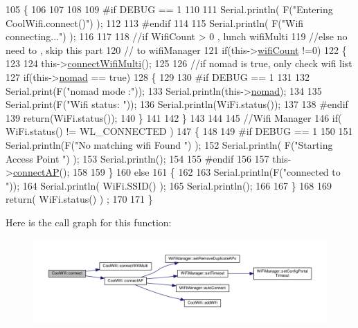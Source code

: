 \begin{DoxyCode}
105 \{       
106 
107 
108 
109 \textcolor{preprocessor}{#if DEBUG == 1 }
110 
111     Serial.println( F(\textcolor{stringliteral}{"Entering CoolWifi.connect()"}) );
112 
113 \textcolor{preprocessor}{#endif}
114 
115     Serial.println( F(\textcolor{stringliteral}{"Wifi connecting..."}) );
116 
117 
118     \textcolor{comment}{//if WifiCount > 0 , lunch wifiMulti}
119     \textcolor{comment}{//else no need to , skip this part}
120     \textcolor{comment}{// to wifiManager  }
121     \textcolor{keywordflow}{if}(this->\hyperlink{class_cool_wifi_ab133bd92fcb895b884deecd6678592e4}{wifiCount} !=0)
122     \{
123     
124         this->\hyperlink{class_cool_wifi_a419de92d738f14b7444cf822b3ab0070}{connectWifiMulti}();
125         
126         \textcolor{comment}{//if nomad is true, only check wifi list}
127         \textcolor{keywordflow}{if}(this->\hyperlink{class_cool_wifi_ab7d9643c4af7bac3be331ef008b2ea27}{nomad} == \textcolor{keyword}{true})
128         \{
129     
130 \textcolor{preprocessor}{        #if DEBUG == 1}
131     
132             Serial.print(F(\textcolor{stringliteral}{"nomad mode :"}));
133             Serial.println(this->\hyperlink{class_cool_wifi_ab7d9643c4af7bac3be331ef008b2ea27}{nomad});
134         
135             Serial.print(F(\textcolor{stringliteral}{"Wifi status: "}));
136             Serial.println(WiFi.status());
137         
138 \textcolor{preprocessor}{        #endif  }
139             \textcolor{keywordflow}{return}(WiFi.status());  
140         \}
141 
142     \}
143 
144 
145     \textcolor{comment}{//Wifi Manager}
146     \textcolor{keywordflow}{if}( WiFi.status() != WL\_CONNECTED ) 
147     \{
148 
149 \textcolor{preprocessor}{    #if DEBUG == 1 }
150     
151         Serial.println(F(\textcolor{stringliteral}{"No matching wifi Found "}) );
152         Serial.println( F(\textcolor{stringliteral}{"Starting Access Point "}) );  
153         Serial.println();
154 
155 \textcolor{preprocessor}{    #endif}
156         
157         this->\hyperlink{class_cool_wifi_a7c857f27161782f5ef1d62d552aff971}{connectAP}();     
158         
159     \}
160     \textcolor{keywordflow}{else}
161     \{
162 
163         Serial.println(F(\textcolor{stringliteral}{"connected to "}));
164         Serial.println( WiFi.SSID() );
165         Serial.println();
166     
167     \}
168     
169     \textcolor{keywordflow}{return}( WiFi.status() ) ;
170 
171 \}
\end{DoxyCode}
Here is the call graph for this function\+:\nopagebreak
\begin{figure}[H]
\begin{center}
\leavevmode
\includegraphics[width=350pt]{d7/d29/class_cool_wifi_ad060353050f40d032a2dbf9e54a768bf_cgraph}
\end{center}
\end{figure}
